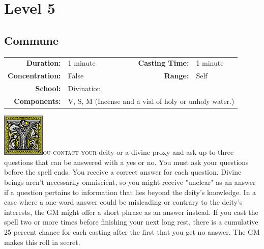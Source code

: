 \documentclass[12pt,showtrims]{memoir}
\begin{document}
\newpage
{}
\newpage
\chapter*{Level 5} 
\section*{Commune}

{
\small\centering\vspace{-6pt}
\begin{tabular}{rlrl}
\toprule

\textbf{Duration:} & 1 minute &
\textbf{Casting Time:} & 1 minute \\
\textbf{Concentration:} & False &
\textbf{Range:} & Self \\
\textbf{School:} & Divination \\
\textbf{Components:} & \multicolumn{3}{p{0.7\textwidth}}{V, S, M (Incense and a vial of holy or unholy water.)}\\

\bottomrule
\end{tabular}
}
\enlargethispage{1\baselineskip}
\vspace{1\baselineskip}\noindent
\lettrine[lines=4]{\includegraphics[height=58pt]{initials/Y.png}}{ou contact your} deity or a divine proxy and ask up to three questions that can be answered with a yes or no. You must ask your questions before the spell ends. You receive a correct answer for each question. Divine beings aren't necessarily omniscient, so you might receive "unclear" as an answer if a question pertains to information that lies beyond the deity's knowledge. In a case where a one-word answer could be misleading or contrary to the deity's interests, the GM might offer a short phrase as an answer instead. If you cast the spell two or more times before finishing your next long rest, there is a cumulative 25 percent chance for each casting after the first that you get no answer. The GM makes this roll in secret.
\end{document}
